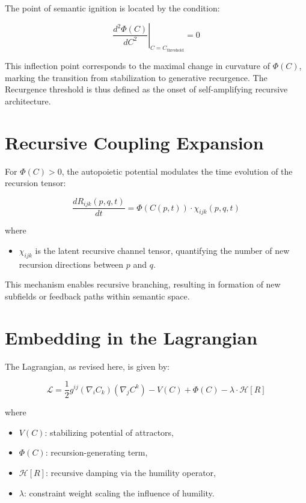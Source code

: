 The point of semantic ignition is located by the condition:

\begin{equation}
\left. \frac{d^2\Phi(C)}{dC^2} \right|_{C = C_{\text{threshold}}} = 0
\end{equation}

This inflection point corresponds to the maximal change in curvature of \(\Phi(C)\), marking the transition from stabilization to generative recurgence. The Recurgence threshold is thus defined as the onset of self-amplifying recursive architecture.

\section{Recursive Coupling Expansion}

For \(\Phi(C) > 0\), the autopoietic potential modulates the time evolution of the recursion tensor:

\begin{equation}
\frac{dR_{ijk}(p,q,t)}{dt} = \Phi(C(p,t)) \cdot \chi_{ijk}(p,q,t)
\end{equation}

where

\begin{itemize}
    \item \(\chi_{ijk}\) is the latent recursive channel tensor, quantifying the number of new recursion directions between \(p\) and \(q\).
\end{itemize}

This mechanism enables recursive branching, resulting in formation of new subfields or feedback paths within semantic space.

\section{Embedding in the Lagrangian}

The Lagrangian, as revised here, is given by:

\begin{equation}
\mathcal{L} = \frac{1}{2} g^{ij} (\nabla_i C_k)(\nabla_j C^k) - V(C) + \Phi(C) - \lambda \cdot \mathcal{H}[R]
\end{equation}

where

\begin{itemize}
    \item \(V(C)\): stabilizing potential of attractors,
    \item \(\Phi(C)\): recursion-generating term,
    \item \(\mathcal{H}[R]\): recursive damping via the humility operator,
    \item \(\lambda\): constraint weight scaling the influence of humility.
\end{itemize}

